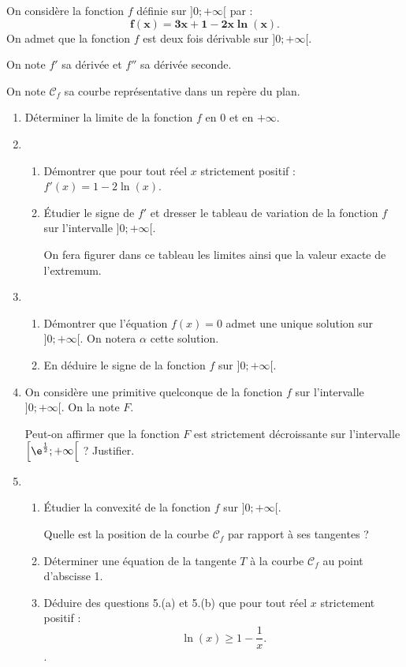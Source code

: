 On considère la fonction $f$ définie sur $]0;+\infty[$ par : \[ \bm{f(x) = 3x + 1 - 2x \ln (x)}.\]
%
On admet que la fonction $f$ est deux fois dérivable sur $]0;+\infty[$. 

On note $f'$ sa dérivée et $f''$ sa dérivée seconde.

On note $\mathcal{C}_f$ sa courbe représentative dans un repère du plan.

\begin{enumerate}
	\item Déterminer la limite de la fonction $f$ en 0 et en $+\infty$.
	\item 
	\begin{enumerate}
		\item Démontrer que pour tout réel $x$ strictement positif : $f'(x) = 1- 2\ln (x)$.
		\item Étudier le signe de $f'$ et dresser le tableau de variation de la fonction $f$ sur l'intervalle $]0;+\infty[$.
		
		On fera figurer dans ce tableau les limites ainsi que la valeur exacte de l'extremum.
	\end{enumerate}
	\item
	\begin{enumerate}
		\item Démontrer que l'équation $f(x) = 0$ admet une unique solution sur $]0;+\infty[$. On notera $\alpha$ cette solution.
		\item En déduire le signe de la fonction $f$ sur $]0;+\infty[$.
	\end{enumerate}	
	\item On considère une primitive quelconque de la fonction $f$ sur l'intervalle $]0;+\infty[$. On la note $F$.
	
	Peut-on affirmer que la fonction $F$ est strictement décroissante sur l'intervalle $\left[\e^{\frac12};+ \infty\right[$ ? Justifier.
	\item
	\begin{enumerate}
		\item Étudier la convexité de la fonction $f$ sur $]0;+\infty[$.
		
		Quelle est la position de la courbe $\mathcal{C}_f$ par rapport à ses tangentes ?
		\item Déterminer une équation de la tangente $T$ à la courbe $\mathcal{C}_f$ au point d'abscisse 1.
		\item Déduire des questions 5.(a) et 5.(b) que pour tout réel $x$ strictement positif : \[\ln (x) \geqslant  1 - \dfrac 1x.\].
	\end{enumerate}
\end{enumerate}
